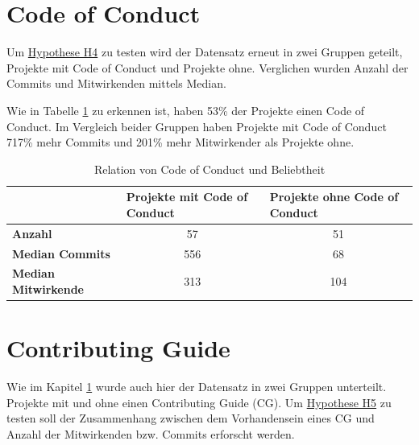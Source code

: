 \newpage %
\section{Code of Conduct}\label{sec:CoC}
Um \hyperref[H:4]{Hypothese H4} zu testen wird
der Datensatz erneut in zwei Gruppen geteilt, Projekte mit Code of Conduct und Projekte
ohne. Verglichen wurden Anzahl der Commits und Mitwirkenden mittels Median. 

Wie in Tabelle \ref{tab:relation_CoC_Popularity} zu erkennen ist, haben 53\% der Projekte einen
Code of Conduct. Im Vergleich beider Gruppen haben Projekte mit Code of Conduct 717\% mehr
Commits und 201\% mehr Mitwirkender als Projekte ohne.


\begin{table}[h]
    \begin{tabular}{l|c|c|}
        \cline{2-3}
                                    & \multicolumn{1}{l|}{\textbf{Projekte mit Code of Conduct}} & \multicolumn{1}{l|}{\textbf{Projekte ohne Code of Conduct}} \\ \hline
        \textbf{Anzahl}             & 57                                                         & 51                                                          \\ \hline
        \textbf{Median Commits}     & 556                                                        & 68                                                          \\ \hline
        \textbf{Median Mitwirkende} & 313                                                        & 104                                                         \\ \cline{2-3}
    \end{tabular}%
    \caption{Relation von Code of Conduct und Beliebtheit}
    \label{tab:relation_CoC_Popularity}
\end{table}





\newpage %
\section{Contributing Guide}

Wie im Kapitel \ref{sec:CoC} wurde auch hier der Datensatz in zwei Gruppen unterteilt. Projekte mit
und ohne einen Contributing Guide (CG). Um \hyperref[H:5]{Hypothese H5} zu testen soll der Zusammenhang
zwischen dem Vorhandensein eines CG und Anzahl der Mitwirkenden bzw. Commits erforscht werden.

